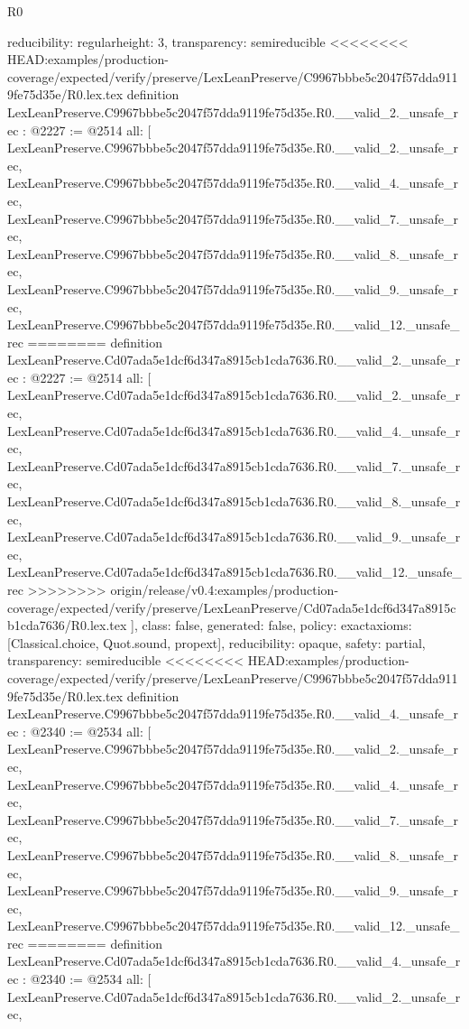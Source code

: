 \begin{lexlean}{R0}
\begin{coremodule}
{{{{{{{{{{{{{{{{{{{{{{{{{{{{{{{{{{{{{{{{{{{{{{{{{{  reducibility: regular{height: 3},
  transparency: semireducible
}
<<<<<<<< HEAD:examples/production-coverage/expected/verify/preserve/LexLeanPreserve/C9967bbbe5c2047f57dda9119fe75d35e/R0.lex.tex
definition LexLeanPreserve.C9967bbbe5c2047f57dda9119fe75d35e.R0.__valid_2._unsafe_rec : @2227 := @2514 {
  all: [
    LexLeanPreserve.C9967bbbe5c2047f57dda9119fe75d35e.R0.__valid_2._unsafe_rec,
    LexLeanPreserve.C9967bbbe5c2047f57dda9119fe75d35e.R0.__valid_4._unsafe_rec,
    LexLeanPreserve.C9967bbbe5c2047f57dda9119fe75d35e.R0.__valid_7._unsafe_rec,
    LexLeanPreserve.C9967bbbe5c2047f57dda9119fe75d35e.R0.__valid_8._unsafe_rec,
    LexLeanPreserve.C9967bbbe5c2047f57dda9119fe75d35e.R0.__valid_9._unsafe_rec,
    LexLeanPreserve.C9967bbbe5c2047f57dda9119fe75d35e.R0.__valid_12._unsafe_rec
========
definition LexLeanPreserve.Cd07ada5e1dcf6d347a8915cb1cda7636.R0.__valid_2._unsafe_rec : @2227 := @2514 {
  all: [
    LexLeanPreserve.Cd07ada5e1dcf6d347a8915cb1cda7636.R0.__valid_2._unsafe_rec,
    LexLeanPreserve.Cd07ada5e1dcf6d347a8915cb1cda7636.R0.__valid_4._unsafe_rec,
    LexLeanPreserve.Cd07ada5e1dcf6d347a8915cb1cda7636.R0.__valid_7._unsafe_rec,
    LexLeanPreserve.Cd07ada5e1dcf6d347a8915cb1cda7636.R0.__valid_8._unsafe_rec,
    LexLeanPreserve.Cd07ada5e1dcf6d347a8915cb1cda7636.R0.__valid_9._unsafe_rec,
    LexLeanPreserve.Cd07ada5e1dcf6d347a8915cb1cda7636.R0.__valid_12._unsafe_rec
>>>>>>>> origin/release/v0.4:examples/production-coverage/expected/verify/preserve/LexLeanPreserve/Cd07ada5e1dcf6d347a8915cb1cda7636/R0.lex.tex
  ],
  class: false,
  generated: false,
  policy: exact{axioms: [Classical.choice, Quot.sound, propext]},
  reducibility: opaque{},
  safety: partial,
  transparency: semireducible
}
<<<<<<<< HEAD:examples/production-coverage/expected/verify/preserve/LexLeanPreserve/C9967bbbe5c2047f57dda9119fe75d35e/R0.lex.tex
definition LexLeanPreserve.C9967bbbe5c2047f57dda9119fe75d35e.R0.__valid_4._unsafe_rec : @2340 := @2534 {
  all: [
    LexLeanPreserve.C9967bbbe5c2047f57dda9119fe75d35e.R0.__valid_2._unsafe_rec,
    LexLeanPreserve.C9967bbbe5c2047f57dda9119fe75d35e.R0.__valid_4._unsafe_rec,
    LexLeanPreserve.C9967bbbe5c2047f57dda9119fe75d35e.R0.__valid_7._unsafe_rec,
    LexLeanPreserve.C9967bbbe5c2047f57dda9119fe75d35e.R0.__valid_8._unsafe_rec,
    LexLeanPreserve.C9967bbbe5c2047f57dda9119fe75d35e.R0.__valid_9._unsafe_rec,
    LexLeanPreserve.C9967bbbe5c2047f57dda9119fe75d35e.R0.__valid_12._unsafe_rec
========
definition LexLeanPreserve.Cd07ada5e1dcf6d347a8915cb1cda7636.R0.__valid_4._unsafe_rec : @2340 := @2534 {
  all: [
    LexLeanPreserve.Cd07ada5e1dcf6d347a8915cb1cda7636.R0.__valid_2._unsafe_rec,
}}}}}}}}}}}}}}}}}}}}}}}}}}}}}}}}}}}}}}}}}}}}}}}}}}}}
\end{coremodule}
\end{lexlean}
